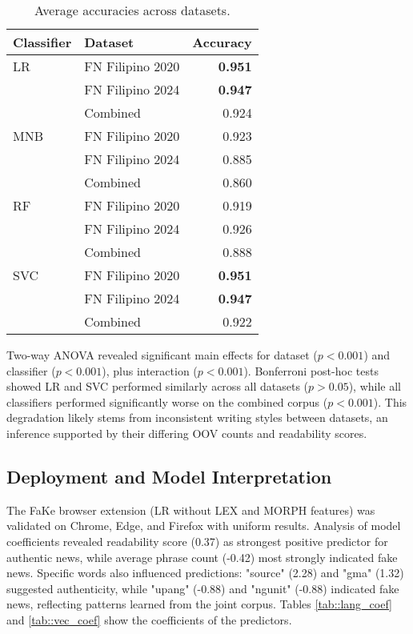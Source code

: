 \documentclass[conference]{IEEEtran}
\begin{document}
\begin{table}[!t]
\centering
\caption{Average accuracies across datasets.}
\label{tab:average_accuracies}
\begin{tabular}{llr}
\hline
\textbf{Classifier} & \textbf{Dataset} & \textbf{Accuracy} \\
\hline
LR & FN Filipino 2020 & \textbf{0.951} \\
 & FN Filipino 2024 & \textbf{0.947} \\
 & Combined & 0.924 \\
\hline
MNB & FN Filipino 2020 & 0.923 \\
 & FN Filipino 2024 & 0.885 \\
 & Combined & 0.860 \\
\hline
RF & FN Filipino 2020 & 0.919 \\
 & FN Filipino 2024 & 0.926 \\
 & Combined & 0.888 \\
\hline
SVC & FN Filipino 2020 & \textbf{0.951} \\
 & FN Filipino 2024 & \textbf{0.947} \\
 & Combined & 0.922 \\
\hline
\end{tabular}
\end{table}

Two-way ANOVA revealed significant main effects for dataset ($p<0.001$) and classifier ($p<0.001$), plus interaction ($p<0.001$). Bonferroni post-hoc tests showed LR and SVC performed similarly across all datasets ($p>0.05$), while all classifiers performed significantly worse on the combined corpus ($p<0.001$). This degradation likely stems from inconsistent writing styles between datasets, an inference supported by their differing OOV counts and readability scores.

\subsection{Deployment and Model Interpretation}
The FaKe browser extension (LR without LEX and MORPH features) was validated on Chrome, Edge, and Firefox with uniform results. Analysis of model coefficients revealed readability score (0.37) as strongest positive predictor for authentic news, while average phrase count (-0.42) most strongly indicated fake news. Specific words also influenced predictions: "source" (2.28) and "gma" (1.32) suggested authenticity, while "upang" (-0.88) and "ngunit" (-0.88) indicated fake news, reflecting patterns learned from the joint corpus. Tables \ref{tab::lang_coef} and \ref{tab::vec_coef} show the coefficients of the predictors.
\end{document}
